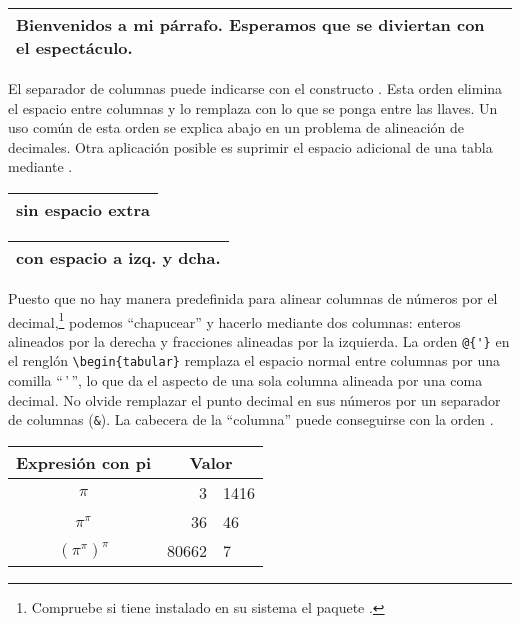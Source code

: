 \begin{example}
\begin{tabular}{|p{4.7cm}|}
\hline
Bienvenidos a mi párrafo.
Esperamos que se diviertan
con el espectáculo.\\
\hline 
\end{tabular}
\end{example}

El separador de columnas puede indicarse con el constructo .  Esta orden elimina el espacio entre columnas y lo remplaza con lo que se ponga entre las llaves.  Un uso común de esta orden se explica abajo en un problema de alineación de decimales. Otra aplicación posible es suprimir el espacio adicional de una tabla
mediante .

\begin{example}
\begin{tabular}{@{} l @{}}
\hline 
sin espacio extra\\
\hline
\end{tabular}
\end{example}

\begin{example}
\begin{tabular}{l}
\hline
con espacio a izq. y dcha.\\
\hline
\end{tabular}
\end{example}

%
%

 Puesto que no hay manera predefinida para alinear columnas de números por el  decimal,\footnote{Compruebe si tiene instalado en su sistema el paquete .} podemos ``chapucear'' y hacerlo mediante dos columnas: enteros alineados por la derecha y fracciones alineadas por la izquierda.  La orden \verb|@{'}| en el renglón \verb|\begin{tabular}| remplaza el espacio normal entre columnas por una comilla ``\,'\,'', lo que da el aspecto de una sola columna alineada por una coma decimal. No olvide remplazar el punto decimal en sus números por un separador de columnas (\verb|&|). La cabecera de la ``columna'' puede conseguirse con la orden .
 
\begin{example}
\begin{tabular}{c r @{'} l}
Expresión con pi    &
\multicolumn{2}{c}{Valor} \\
\hline
$\pi$               & 3&1416  \\
$\pi^{\pi}$         & 36&46   \\
$(\pi^{\pi})^{\pi}$ & 80662&7 \\
\end{tabular}
\end{example}

